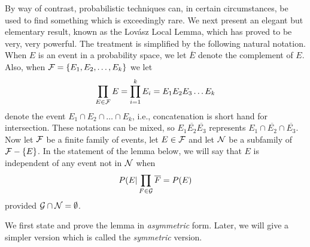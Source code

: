 By way of contrast, probabilistic techniques can, in certain
circumstances, be used to find something which is exceedingly
rare.  We next present an elegant but elementary result, known
as the Lov\'asz Local Lemma, which has
proved to be very, very powerful.  The treatment is simplified
by the following natural notation.   When $E$ is an event
in a probability space, we let $\overline{E}$ denote the complement
of $E$.  Also, when $\mathcal{F}=\{E_1,E_2,\dots,E_k\}$ we
let
\[
\prod_{E\in\mathcal{F}}E=\prod_{i=1}^k E_i=E_1E_2E_3\dots E_k
\]
denote the event $E_1\cap E_2\cap\dots\cap E_k$, i.e.,
concatenation is short hand for intersection.  These notations
can be mixed, so $E_1\overline{E_2}\overline{E_3}$ represents
$E_1\cap \overline{E_2}\cap\overline{E_3}$.   Now let $\mathcal{F}$
be a finite family of events, let $E\in\mathcal{F}$ and let $\mathcal{N}$
be a subfamily of $\mathcal{F}-\{E\}$.  In the statement of the lemma 
below, we will say that $E$ is independent of any event not in 
$\mathcal{N}$ when
\[
P(E|\prod_{F\in\mathcal{G}}\overline{F}=P(E)
\]
provided $\mathcal{G}\cap\mathcal{N}=\emptyset$.

We first state and prove the lemma in \textit{asymmetric} form.
Later, we will give a simpler version which is called the
\textit{symmetric} version.


